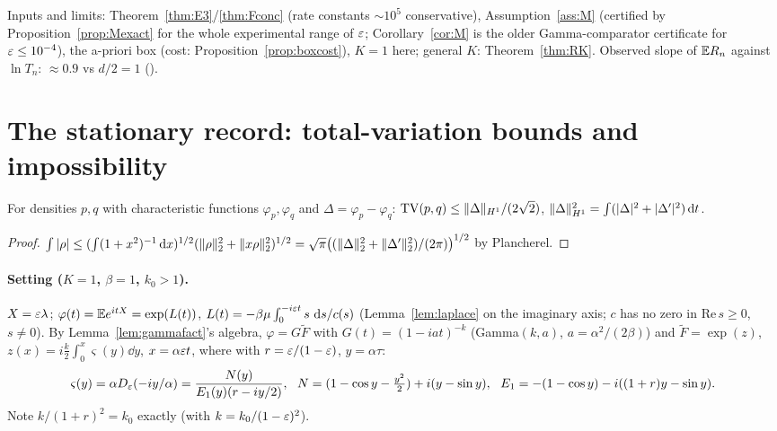 Inputs and limits: Theorem~\ref{thm:E3}/\ref{thm:Fconc} (rate constants $\sim10^5$ conservative), Assumption~\ref{ass:M} (certified by Proposition~\ref{prop:Mexact} for the whole experimental range of $\varepsilon$; Corollary~\ref{cor:M} is the older Gamma-comparator certificate for $\varepsilon\le10^{-4}$), the a-priori box (cost: Proposition~\ref{prop:boxcost}), $K=1$ here; general $K$: Theorem~\ref{thm:RK}. Observed slope of $\mathbb{E} R_n$ against $\ln T_n$: $\approx0.9$ vs $d/2=1$ (\Nt{}).



\section{The stationary record: total-variation bounds and impossibility}\label{sec:tv}

\begin{lemma}\label{lem:LemmaF}\Pt{}
For densities $p,q$ with characteristic functions $\varphi_p,\varphi_q$ and $\Delta=\varphi_p-\varphi_q$: $\mathrm{TV}(p,q)\le\lVert \Delta\rVert_{H^1}/(2\sqrt2)$, $\lVert \Delta\rVert_{H^1}^2=\int(|\Delta|^2+|\Delta'|^2)\,\mathrm d t$.
\end{lemma}
\begin{proof}
$\int|\rho|\le(\int(1+x^2)^{-1}\,\mathrm d x)^{1/2}(\lVert \rho\rVert_2^2+\lVert x\rho\rVert_2^2)^{1/2}=\sqrt\pi\big((\lVert \Delta\rVert_2^2+\lVert \Delta'\rVert_2^2)/(2\pi)\big)^{1/2}$ by Plancherel.
\end{proof}

\paragraph{Setting ($K=1$, $\beta=1$, $k_0>1$).} $X=\varepsilon\lambda$; $\varphi(t)=\mathbb{E} e^{itX}=\exp(L(t))$, $L(t)=-\beta\mu\int_0^{-i\varepsilon t}s\,\,\mathrm d s/c(s)$ (Lemma~\ref{lem:laplace} on the imaginary axis; $c$ has no zero in $\mathrm{Re}\,s\ge0$, $s\ne0$). By Lemma~\ref{lem:gammafact}'s algebra, $\varphi=G\tilde F$ with $G(t)=(1-iat)^{-k}$ (Gamma$(k,a)$, $a=\alpha^2/(2\beta)$) and $\tilde F=\exp(z)$, $z(x)=i\frac k2\int_0^x\varsigma(y)\dd y$, $x=\alpha\varepsilon t$, where with $r=\varepsilon/(1-\varepsilon)$, $y=\alpha\tau$:
\[
\varsigma(y)=\alpha D_\varepsilon(-iy/\alpha)=\frac{N(y)}{E_1(y)(r-iy/2)},\ \ N=(1-\cos y-\tfrac{y^2}2)+i(y-\sin y),\ \ E_1=-(1-\cos y)-i((1+r)y-\sin y).
\]
Note $k/(1+r)^2=k_0$ exactly (with $k=k_0/(1-\varepsilon)^2$).

